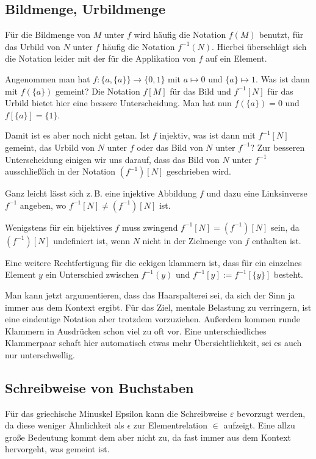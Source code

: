 \documentclass[a4paper,11pt,fleqn,twoside,BCOR=16mm]{scrartcl}
\begin{document}
\subsection{Bildmenge, Urbildmenge}

Für die Bildmenge von $M$ unter $f$ wird häufig die Notation $f(M)$
benutzt, für das Urbild von $N$ unter $f$ häufig die
Notation $f^{-1}(N)$. Hierbei überschlägt sich die Notation leider mit
der für die Applikation von $f$ auf ein Element.

Angenommen man hat $f\colon \{a,\{a\}\}\to\{0,1\}$ mit $a\mapsto 0$ und
$\{a\}\mapsto 1$. Was ist dann mit $f(\{a\})$ gemeint? Die Notation
$f[M]$ für das Bild und $f^{-1}[N]$ für das Urbild bietet hier eine
bessere Unterscheidung. Man hat nun $f(\{a\})=0$ und
$f[\{a\}]=\{1\}$.

Damit ist es aber noch nicht getan. Ist $f$ injektiv,
was ist dann mit $f^{-1}[N]$ gemeint, das Urbild
von $N$ unter $f$ oder das Bild von $N$ unter $f^{-1}$? Zur besseren
Unterscheidung einigen wir uns darauf, dass das Bild von $N$
unter $f^{-1}$ ausschließlich in der Notation $(f^{-1})[N]$
geschrieben wird.

Ganz leicht lässt sich z.\,B. eine injektive Abbildung $f$ und dazu
eine Linksinverse $f^{-1}$ angeben, wo $f^{-1}[N]\ne (f^{-1})[N]$ ist.

Wenigstens für ein bijektives $f$ muss zwingend
$f^{-1}[N]=(f^{-1})[N]$ sein, da $(f^{-1})[N]$ undefiniert ist,
wenn $N$ nicht in der Zielmenge von $f$ enthalten ist.

Eine weitere Rechtfertigung für die eckigen klammern ist,
dass für ein einzelnes Element $y$ ein Unterschied
zwischen $f^{-1}(y)$ und $f^{-1}[y]:=f^{-1}[\{y\}]$
besteht.

Man kann jetzt argumentieren, dass das Haarspalterei sei,
da sich der Sinn ja immer aus dem Kontext ergibt. Für das Ziel,
mentale Belastung zu verringern, ist eine eindeutige Notation
aber trotzdem vorzuziehen. Außerdem kommen runde Klammern in
Ausdrücken schon viel zu oft vor. Eine unterschiedliches Klammerpaar
schaft hier automatisch etwas mehr Übersichtlichkeit, sei es
auch nur unterschwellig.

\subsection{Schreibweise von Buchstaben}

Für das griechische Minuskel Epsilon kann die Schreibweise
$\varepsilon$ bevorzugt werden, da diese weniger Ähnlichkeit als
$\epsilon$ zur Elementrelation $\in$ aufzeigt. Eine allzu große
Bedeutung kommt dem aber nicht zu, da fast immer aus dem Kontext
hervorgeht, was gemeint ist.
\end{document}
